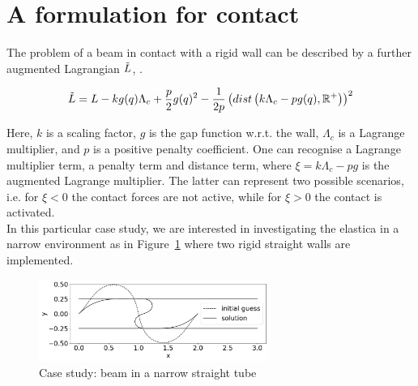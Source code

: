 \section*{A formulation for contact}

The problem of a beam in contact with a rigid wall can be described by a further augmented Lagrangian $\Tilde{L}$, \cite{alart1991}.

\begin{equation}\label{eq:L_constraint}
    \Tilde{L} = L - k g(q) \Lambda_c + \frac{p}{2} g(q)^2 - \frac{1}{2p} \left( dist\left( k \Lambda_c - pg(q), \mathbb{R}^+ \right) \right)^2
\end{equation}

Here, $k$ is a scaling factor, $g$ is the gap function w.r.t. the wall, $\Lambda_c$ is a Lagrange multiplier, and $p$ is a positive penalty coefficient. One can recognise a Lagrange multiplier term, a penalty term and distance term, where $\xi=k \Lambda_c - pg$ is the augmented Lagrange multiplier. The latter can represent two possible scenarios, i.e. for $\xi<0$ the contact forces are not active, while for $\xi>0$ the contact is activated. \\
In this particular case study, we are interested in investigating the elastica in a narrow environment as in Figure~\ref{fig:ESR10_contact} where two rigid straight walls are implemented.

\begin{figure}[!ht]
    \centering
    \includegraphics[width=7.5cm]{figures/contact_bw.png}
    \caption{Case study: beam in a narrow straight tube}
    \label{fig:ESR10_contact}
\end{figure}





